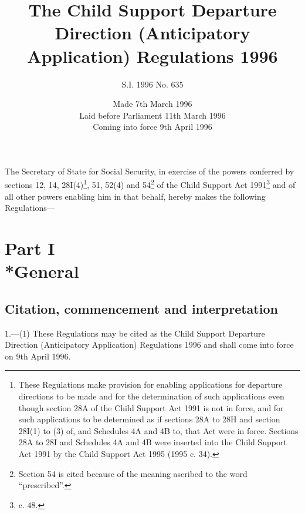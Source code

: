 \documentclass[a4paper]{article}
\title{The Child Support Departure Direction (Anticipatory Application) Regulations 1996}
\author{S.I. 1996 No. 635}
\date{Made 7th March 1996\\Laid before Parliament 11th March 1996\\Coming into force 9th April 1996
}
\newcommand{\parthead}{}
\begin{document}
\maketitle

\noindent
The Secretary of State for Social Security, in exercise of the powers conferred by sections 12, 14, 28I(4)\footnote{\frenchspacing These Regulations make provision for enabling applications for departure directions to be made and for the determination of such applications even though section 28A of the Child Support Act 1991 is not in force, and for such applications to be determined as if sections 28A to 28H and section 28I(1) to (3) of, and Schedules 4A and 4B to, that Act were in force. Sections 28A to 28I and Schedules 4A and 4B were inserted into the Child Support Act 1991 by the Child Support Act 1995 (1995 c. 34).}, 51, 52(4) and 54\footnote{\frenchspacing Section 54 is cited because of the meaning ascribed to the word “prescribed”.} of the Child Support Act 1991\footnote{ c. 48.} and of all other powers enabling him in that behalf, hereby makes the following Regulations—

{\sloppy

\tableofcontents

}

\setcounter{secnumdepth}{-2}

\section[Part I --- General]{Part I\\*General}

\renewcommand\parthead{--- Part I}

\subsection[1. Citation, commencement and interpretation]{Citation, commencement and interpretation}

1.—(1) These Regulations may be cited as the Child Support Departure Direction (Anticipatory Application) Regulations 1996 and shall come into force on 9th April 1996.
\end{document}
